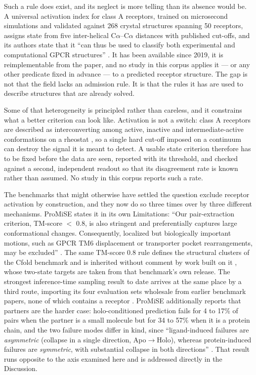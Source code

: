 Such a rule does exist, and its neglect is more telling than its absence would be. A universal
activation index for class A receptors, trained on microsecond simulations and validated against
268 crystal structures spanning 50 receptors, assigns state from five inter-helical
C$\alpha$--C$\alpha$ distances with published cut-offs, and its authors state that it ``can thus be
used to classify both experimental and computational GPCR structures''
\citep[p.~3938]{ibrahim2019a100}. It has been available since 2019, it is reimplementable from the
paper, and no study in this corpus applies it --- or any other predicate fixed in advance --- to a
predicted receptor structure. The gap is not that the field lacks an admission rule. It is that the
rules it has are used to describe structures that are already solved.

Some of that heterogeneity is principled rather than careless, and it constrains what a better
criterion can look like. Activation is not a switch: class A receptors are described as
interconverting among active, inactive and intermediate-active conformations on a rheostat
\citep[p.~3696]{georgiou2025heterogeneity}, so a single hard cut-off imposed on a continuum can
destroy the signal it is meant to detect. A usable state criterion therefore has to be fixed before
the data are seen, reported with its threshold, and checked against a second, independent readout
so that its disagreement rate is known rather than assumed. No study in this corpus reports such a
rate.

The benchmarks that might otherwise have settled the question exclude receptor activation by
construction, and they now do so three times over by three different mechanisms. ProMiSE states it
in its own Limitations: ``Our pair-extraction criterion, TM-score $<$ 0.8, is also stringent and
preferentially captures large conformational changes. Consequently, localized but biologically
important motions, such as GPCR TM6 displacement or transporter pocket rearrangements, may be
excluded'' \citep[p.~9]{ku2026promise}. The same TM-score 0.8 rule defines the structural clusters of the
Cfold benchmark \citep[p.~7]{bryant2024cfold} and is inherited without comment by work built on it
\citep{kalakoti2026afsample3}, whose two-state targets are taken from that benchmark's own release. The
strongest inference-time sampling result to date arrives at the same place by a third route,
importing its four evaluation sets wholesale from earlier benchmark papers, none of which contains
a receptor \citep{richman2025conformix}. ProMiSE additionally reports that partners are the harder case:
holo-conditioned prediction fails for 4 to 17\% of pairs when the partner is a small molecule but
for 34 to 57\% when it is a protein chain, and the two failure modes differ in kind, since
``ligand-induced failures are \emph{asymmetric} (collapse in a single direction, Apo$\rightarrow$Holo), whereas
protein-induced failures are \emph{symmetric}, with substantial collapse in both directions''
\citep[p.~17]{ku2026promise}. That result runs opposite to the axis examined here and is addressed directly
in the Discussion.

